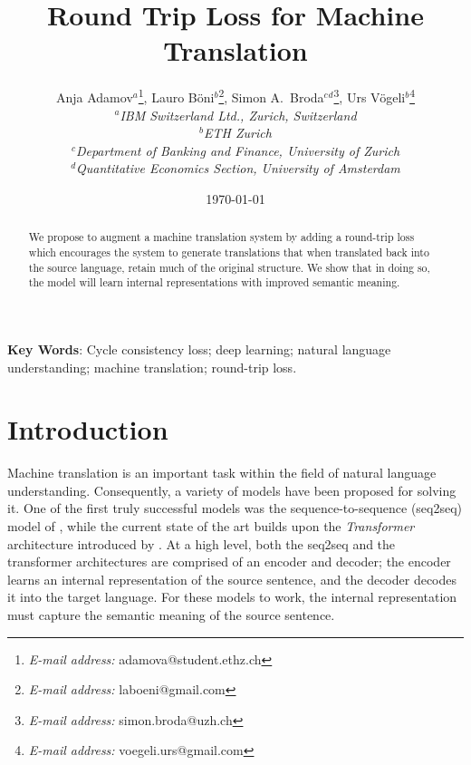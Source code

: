 \documentclass[11pt,a4paper]{article}
\begin{document}
\title{Round Trip Loss for Machine Translation}
\date{\today}
\author{
Anja Adamov$\mbox{}^a$\thanks{\emph{E-mail address:} adamova@student.ethz.ch},
Lauro B\"{o}ni$\mbox{}^b$\thanks{\emph{E-mail address:} laboeni@gmail.com},
Simon A.\ Broda$\mbox{}^c\mbox{}^d$\thanks{\emph{E-mail address:} simon.broda@uzh.ch},
Urs V\"{o}geli$\mbox{}^b$\thanks{\emph{E-mail address:} voegeli.urs@gmail.com}
\medskip \\
\textit{\small $\mbox{}^a$IBM Switzerland Ltd., Zurich, Switzerland}
\medskip \\
\textit{\small $\mbox{}^b$ETH Zurich}
\medskip \\
\textit{\small $\mbox{}^c$Department of Banking and Finance, University of Zurich}
\medskip \\
\textit{\small $\mbox{}^d$Quantitative Economics Section, University of Amsterdam}
}
\maketitle \setcounter{page}{0}\thispagestyle{empty}
\begin{abstract}
We propose to augment a machine translation system by adding a round-trip loss which encourages the system to generate translations that when translated back into the source language, retain much of the original structure. We show that in doing so, the model will learn internal representations with improved semantic meaning.
\end{abstract}
\bigskip \textbf{Key Words}: Cycle consistency loss; deep learning; natural language understanding; machine translation; round-trip loss.
\newpage
\setcounter{page}{1}
\section{Introduction}
Machine translation is an important task within the field of natural language understanding. Consequently, a variety of models have been proposed for solving it. One of the first truly successful models was the sequence-to-sequence (seq2seq) model of \citet{seq2seq}, while the current state of the art builds upon the \emph{Transformer} architecture introduced by \citet{transformer}. At a high level, both the seq2seq and the transformer architectures are comprised of an encoder and decoder; the encoder learns an internal representation of the source sentence, and the decoder decodes it into the target language. For these models to work, the internal representation must capture the semantic meaning of the source sentence.
\end{document}
